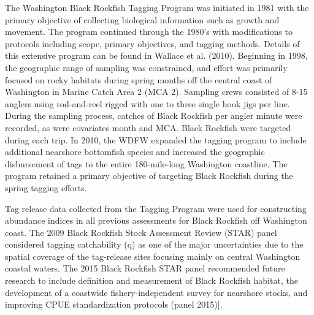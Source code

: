 \documentclass[11pt,
  english,
  letterpaper,
]{article}
\begin{document}
The Washington Black Rockfish Tagging Program was initiated in 1981 with the primary objective of collecting biological information such as growth and movement. The program continued through the 1980's with modifications to protocols including scope, primary objectives, and tagging methods. Details of this extensive program can be found in Wallace et al. (2010). Beginning in 1998, the geographic range of sampling was constrained, and effort was primarily focused on rocky habitats during spring months off the central coast of Washington in Marine Catch Area 2 (MCA 2). Sampling crews consisted of 8-15 anglers using rod-and-reel rigged with one to three single hook jigs per line. During the sampling process, catches of Black Rockfish per angler minute were recorded, as were covariates month and MCA. Black Rockfish were targeted during each trip. In 2010, the WDFW expanded the tagging program to include additional nearshore bottomfish species and increased the geographic disbursement of tags to the entire 180-mile-long Washington coastline. The program retained a primary objective of targeting Black Rockfish during the spring tagging efforts.

Tag release data collected from the Tagging Program were used for constructing abundance indices in all previous assessments for Black Rockfish off Washington coast. The 2009 Black Rockfish Stock Assessment Review (STAR) panel considered tagging catchability (q) as one of the major uncertainties due to the spatial coverage of the tag-release sites focusing mainly on central Washington coastal waters. The 2015 Black Rockfish STAR panel recommended future research to include definition and measurement of Black Rockfish habitat, the development of a coastwide fishery-independent survey for nearshore stocks, and improving CPUE standardization protocols (panel 2015){]}.
\end{document}
